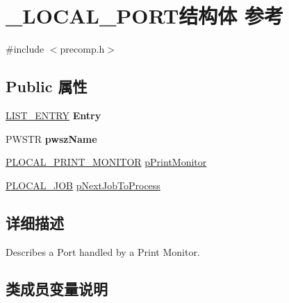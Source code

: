 \hypertarget{struct___l_o_c_a_l___p_o_r_t}{}\section{\+\_\+\+L\+O\+C\+A\+L\+\_\+\+P\+O\+R\+T结构体 参考}
\label{struct___l_o_c_a_l___p_o_r_t}


{\ttfamily \#include $<$precomp.\+h$>$}

\subsection*{Public 属性}
\begin{DoxyCompactItemize}
\item 
\mbox{\label{struct___l_o_c_a_l___p_o_r_t_a7bf0ec129cbe747011b33d91ecc5abe9}} 
\hyperlink{struct___l_i_s_t___e_n_t_r_y}{L\+I\+S\+T\+\_\+\+E\+N\+T\+RY} {\bfseries Entry}
\item 
\mbox{\label{struct___l_o_c_a_l___p_o_r_t_a21695a92e5bc51c6052304a85187d4a1}} 
P\+W\+S\+TR {\bfseries pwsz\+Name}
\item 
\hyperlink{struct___l_o_c_a_l___p_r_i_n_t___m_o_n_i_t_o_r}{P\+L\+O\+C\+A\+L\+\_\+\+P\+R\+I\+N\+T\+\_\+\+M\+O\+N\+I\+T\+OR} \hyperlink{struct___l_o_c_a_l___p_o_r_t_a911e86de699d0b3af86a04eb0824eb75}{p\+Print\+Monitor}
\item 
\hyperlink{struct___l_o_c_a_l___j_o_b}{P\+L\+O\+C\+A\+L\+\_\+\+J\+OB} \hyperlink{struct___l_o_c_a_l___p_o_r_t_ae75d745df66b2f7ab63abf1df5bd516a}{p\+Next\+Job\+To\+Process}
\end{DoxyCompactItemize}


\subsection{详细描述}
Describes a Port handled by a Print Monitor. 

\subsection{类成员变量说明}
\mbox{\label{struct___l_o_c_a_l___p_o_r_t_ae75d745df66b2f7ab63abf1df5bd516a}} 
